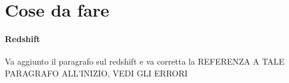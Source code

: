 \section{Cose da fare}
\paragraph{Redshift}\label{sec:redshift}
Va aggiunto il paragrafo sul redshift e va corretta la REFERENZA A TALE PARAGRAFO ALL'INIZIO, VEDI GLI ERRORI